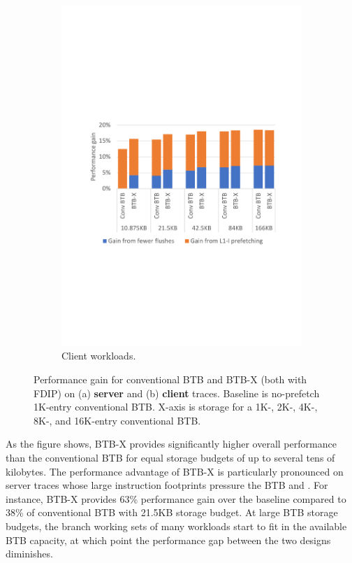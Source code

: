 \begin{figure}
    ~ %
    \begin{subfigure}[t]{0.8\columnwidth}
        \centering
        \includegraphics[width=\columnwidth, trim=70 230 60 230, clip]{figures/clientRes3.pdf}
        \caption{Client workloads.}
        \label{cal:fig:clientPerf}
    \end{subfigure}
    \caption{Performance gain for conventional BTB and BTB-X (both with FDIP) on (a) \textbf{server} and (b) \textbf{client} traces. Baseline is no-prefetch 1K-entry conventional BTB. X-axis is storage for a 1K-, 2K-, 4K-, 8K-, and 16K-entry conventional BTB.}
    \label{cal:fig:perf}
\end{figure}

As the figure shows, BTB-X provides significantly higher overall performance than the conventional BTB for equal storage budgets of up to several tens of kilobytes. The performance advantage of BTB-X is particularly pronounced on server traces whose large instruction footprints pressure the BTB and . For instance, BTB-X provides 63\% performance gain over the baseline compared to 38\% of conventional BTB with 21.5KB storage budget.
At large BTB storage budgets, the branch working sets of many workloads start to fit in the available BTB capacity, at which point the performance gap between the two designs diminishes.

